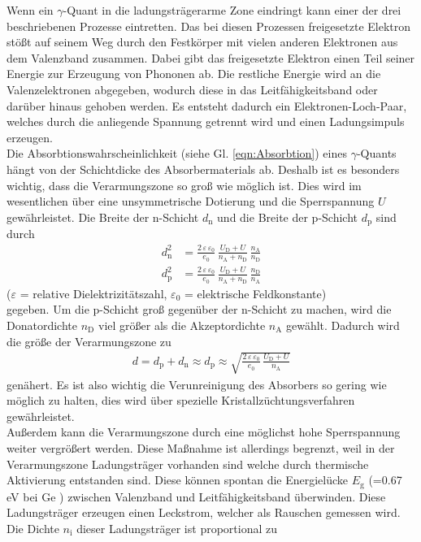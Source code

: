 Wenn ein $\gamma$-Quant in die ladungsträgerarme Zone eindringt kann einer der drei beschriebenen Prozesse eintretten. Das bei diesen Prozessen freigesetzte Elektron stößt auf seinem Weg durch den Festkörper mit vielen anderen Elektronen aus dem Valenzband zusammen. Dabei gibt das freigesetzte Elektron einen Teil seiner Energie zur Erzeugung von Phononen ab. Die restliche Energie wird an die Valenzelektronen abgegeben, wodurch diese in das Leitfähigkeitsband oder darüber hinaus gehoben werden. Es entsteht dadurch ein Elektronen-Loch-Paar, welches durch die anliegende Spannung getrennt wird und einen Ladungsimpuls erzeugen. \\
Die Absorbtionswahrscheinlichkeit (siehe Gl. \eqref{eqn:Absorbtion}) eines $\gamma$-Quants hängt von der Schichtdicke des Absorbermaterials ab. Deshalb ist es besonders wichtig, dass die Verarmungszone so groß wie möglich ist. Dies wird im wesentlichen über eine unsymmetrische Dotierung und die Sperrspannung $U$ gewährleistet. Die Breite der n-Schicht $d_\text{n}$ und die Breite der p-Schicht $d_\text{p}$ sind durch
\begin{align}
	d_\text{n}^2 &= \frac{2\,\varepsilon\,\varepsilon_0} {e_0} \, \frac{U_\text{D} + U}{n_\text{A} + n_\text{D}} \, \frac{n_\text{A}}{n_\text{D}} \\
	d_\text{p}^2 &= \frac{2\,\varepsilon\,\varepsilon_0} {e_0} \, \frac{U_\text{D} + U} {n_\text{A} + n_\text{D}} \, \frac{n_\text{D}}{n_\text{A}}
\end{align}
\hfil {\footnotesize($\varepsilon$ = relative Dielektrizitätszahl, $\varepsilon_0$ = elektrische Feldkonstante)} \hfil \\
gegeben. Um die p-Schicht groß gegenüber der n-Schicht zu machen, wird die Donatordichte $n_\text{D}$ viel größer als die Akzeptordichte $n_\text{A}$ gewählt. Dadurch wird die größe der Verarmungszone zu
\begin{align}
	d = d_\text{p} + d_\text{n} \approx d_\text{p} \approx \sqrt{\frac{2\,\varepsilon\,\varepsilon_0} {e_0} \, \frac{U_\text{D} + U}{n_\text{A}}}
\end{align}
genähert. Es ist also wichtig die Verunreinigung des Absorbers so gering wie möglich zu halten, dies wird über spezielle Kristallzüchtungsverfahren gewährleistet. \\ Außerdem kann die Verarmungszone durch eine möglichst hohe Sperrspannung weiter vergrößert werden. Diese Maßnahme ist allerdings begrenzt, weil in der Verarmungszone Ladungsträger vorhanden sind welche durch thermische Aktivierung entstanden sind. Diese können spontan die Energielücke $E_\text{g}$ (=0.67\,eV bei Ge \cite[13]{V18}) zwischen Valenzband und Leitfähigkeitsband überwinden. Diese Ladungsträger erzeugen einen Leckstrom, welcher als Rauschen gemessen wird. Die Dichte $n_\text{i}$ dieser Ladungsträger ist proportional zu

